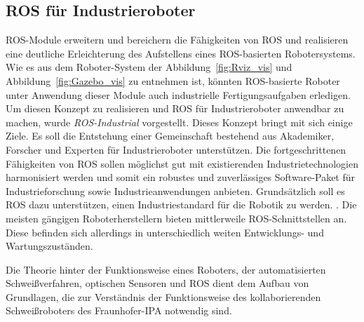 \subsection{ROS für Industrieroboter} \label{ssec:ros_industrial}
ROS-Module erweitern und bereichern die Fähigkeiten von ROS und realisieren eine deutliche Erleichterung des Aufstellens eines ROS-basierten Robotersystems. Wie es aus dem Roboter-System der Abbildung~\ref{fig:Rviz_vis} und Abbildung~\ref{fig:Gazebo_vis} zu entnehmen ist, könnten ROS-basierte Roboter unter Anwendung dieser Module auch industrielle Fertigungsaufgaben erledigen. Um diesen Konzept zu realisieren und ROS für Industrieroboter anwendbar zu machen, wurde \emph{ROS-Industrial} vorgestellt. Dieses Konzept bringt mit sich einige Ziele. Es soll die Entstehung einer Gemeinschaft bestehend aus Akademiker, Forscher und Experten für Industrieroboter unterstützen. Die fortgeschrittenen Fähigkeiten von ROS sollen möglichst gut mit existierenden Industrietechnologien harmonisiert werden und somit ein robustes und zuverlässiges Software-Paket für Industrieforschung sowie Industrieanwendungen anbieten. Grundsätzlich soll es ROS dazu unterstützen, einen Industriestandard für die Robotik zu werden. \autocite[476]{LentinMasteringROS2018}. Die meisten gängigen Roboterherstellern bieten mittlerweile ROS-Schnittstellen an. Diese befinden sich allerdings in unterschiedlich weiten Entwicklungs- und Wartungszuständen.

Die Theorie hinter der Funktionsweise eines Roboters, der automatisierten Schweißverfahren, optischen Sensoren und ROS dient dem Aufbau von Grundlagen, die zur Verständnis der Funktionsweise des kollaborierenden Schweißroboters des Fraunhofer-IPA notwendig sind. 
